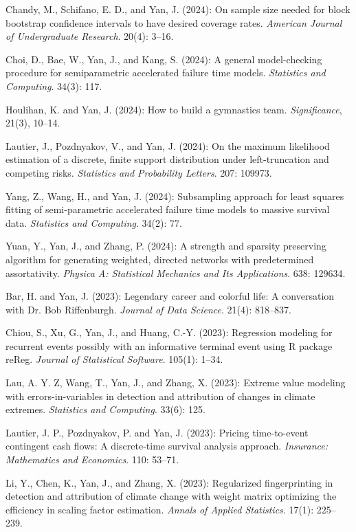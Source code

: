 \documentclass[Statistics]{vita}
\begin{document}
\begin{vita}
\begin{Publications}
\begin{RefereedJournalArticles}
  \item *Chandy, M., Schifano, E. D., and Yan, J. (2024): On sample size needed for block bootstrap confidence intervals to have desired coverage rates. {\em American Journal of Undergraduate Research\/}. 20(4): 3--16.
  \item Choi, D., Bae, W., Yan, J., and Kang, S. (2024): A general model-checking procedure for semiparametric accelerated failure time models. {\em Statistics and Computing\/}. 34(3): 117.
  \item *Houlihan, K. and Yan, J. (2024): How to build a gymnastics team. {\em Significance\/}, 21(3), 10--14. 
  \item *Lautier, J., Pozdnyakov, V., and Yan, J. (2024): On the maximum likelihood estimation of a discrete, finite support distribution under left-truncation and competing risks. {\em Statistics and Probability Letters\/}. 207: 109973.
  \item *Yang, Z., Wang, H., and Yan, J. (2024): Subsampling approach for least squares fitting of semi-parametric accelerated failure time models to massive survival data. {\em Statistics and Computing\/}. 34(2): 77.
  \item *Yuan, Y., Yan, J., and Zhang, P. (2024): A strength and sparsity preserving algorithm for generating weighted, directed networks with predetermined assortativity. {\em Physica A: Statistical Mechanics and Its Applications\/}. 638: 129634.
  \item Bar, H. and Yan, J. (2023): Legendary career and colorful life: A conversation with Dr. Bob Riffenburgh. {\em Journal of Data Science\/}. 21(4): 818--837.
  \item Chiou, S., Xu, G., Yan, J., and Huang, C.-Y. (2023): Regression modeling for recurrent events possibly with an informative terminal event using R package {reReg}. {\em Journal of Statistical Software\/}. 105(1): 1--34.
  \item *Lau, A. Y. Z, Wang, T., Yan, J., and Zhang, X. (2023): Extreme value modeling with errors-in-variables in detection and attribution of changes in climate extremes. {\em Statistics and Computing\/}. 33(6): 125.
  \item *Lautier, J. P., Pozdnyakov, P. and Yan, J. (2023): Pricing time-to-event contingent cash flows: A discrete-time survival analysis approach. {\em Insurance: Mathematics and Economics\/}. 110: 53--71.
  \item *Li, Y., Chen, K., Yan, J., and Zhang, X. (2023): Regularized fingerprinting in detection and attribution of climate change with weight matrix optimizing the efficiency in scaling factor estimation. {\em Annals of Applied Statistics\/}. 17(1): 225--239.

\end{RefereedJournalArticles}
\end{Publications}
\end{vita}
\end{document}
